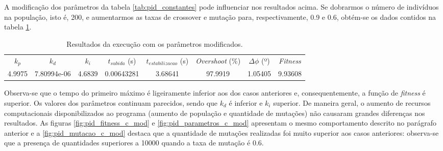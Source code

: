 \begin {enumerate}
	
	\FloatBarrier
	
	 A modificação dos parâmetros da tabela \ref{tab:pid_constantes} pode
	 influenciar nos resultados acima. Se dobrarmos o número de indivíduos na
	 população, isto é, 200, e aumentarmos as taxas de crossover e mutação para,
	 respectivamente, 0.9 e 0.6, obtém-se os dados contidos na tabela
	 \ref{tab:pid_c_2}.
    
    \begin{table}[h]
	    \centering
		\caption{\label{tab:pid_c_2} Resultados da execução com os parâmetros
		modificados.}
		\begin{tabular}{| c | c | c | c | c | c | c | c |}
			\hline
			\(k_p\) & \(k_d\) & \(k_i\) &
			\(t_{subida} \) (s) & \(t_{estabilizacao}\) (s) & \textit{Overshoot} (\%) &
			\(\Delta \phi\) (º)& \textit{Fitness}\\ \hhline{|=|=|=|=|=|=|=|=|}
			4.9975 & 7.80994e-06 & 4.6839 & 0.00643281 & 3.68641 &  97.9919  &
			1.05405 & 9.93608\\ \hline 
		\end{tabular}	    
    \end{table}
    
    Observa-se que o tempo do primeiro máximo é ligeiramente inferior aos dos
    casos anteriores e, consequentemente, a função de \textit{fitness} é
    superior.  Os valores dos parâmetros continuam parecidos, sendo que \(k_d\)
    é inferior e \(k_i\) superior. De maneira geral, o aumento de recursos
    computacionais disponibilizados ao programa (aumento de população e
    quantidade de mutações) não causaram grandes diferenças nos resultados. As
    figuras \ref{fig:pid_fitness_c_mod} e \ref{fig:pid_parametros_c_mod}
    apresentam o mesmo comportamento descrito no parágrafo anterior e a
    \ref{fig:pid_mutacao_c_mod} destaca que a quantidade de mutações realizadas
    foi muito superior aos casos anteriores: observa-se que a presença de
    quantidades superiores a 10000 quando a taxa de mutação é 0.6.

	\FloatBarrier
			    
	\begin{figure}[h!]
	
	\centering
	

\end{figure}
\end{enumerate}
